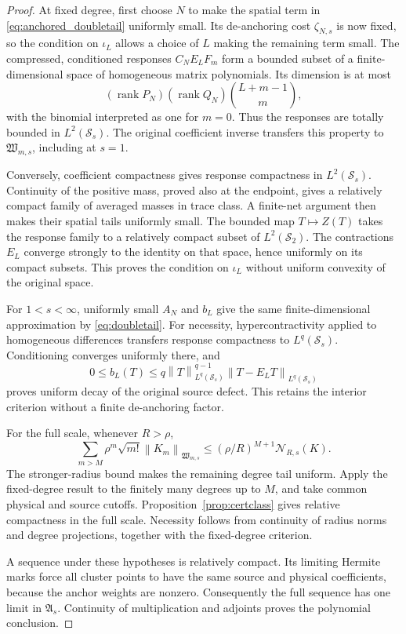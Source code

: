 \documentclass[11pt,a4paper]{amsart}
\numberwithin{equation}{section}
\theoremstyle{definition}
\theoremstyle{remark}
\newcommand{\Sch}{\mathcal S}
\newcommand{\Wc}{\mathfrak W}
\newcommand{\Alg}{\mathfrak A}
\DeclareMathOperator{\rank}{rank}
\newcommand{\norm}[1]{\left\lVert#1\right\rVert}
\newcommand{\Nn}[2]{\mathcal N_{#1,s}(#2)}
\begin{document}
\begin{proof}
At fixed degree, first choose $N$ to make the spatial term in \eqref{eq:anchored_doubletail} uniformly small. Its de-anchoring cost $\zeta_{N,s}$ is now fixed, so the condition on $\iota_L$ allows a choice of $L$ making the remaining term small. The compressed, conditioned responses $C_NE_LF_m$ form a bounded subset of a finite-dimensional space of homogeneous matrix polynomials. Its dimension is at most
\[
 (\rank P_N)(\rank Q_N)\binom{L+m-1}{m},
\]
with the binomial interpreted as one for $m=0$. Thus the responses are totally bounded in $L^2(\Sch_s)$. The original coefficient inverse transfers this property to $\Wc_{m,s}$, including at $s=1$.

Conversely, coefficient compactness gives response compactness in $L^2(\Sch_s)$. Continuity of the positive mass, proved also at the endpoint, gives a relatively compact family of averaged masses in trace class. A finite-net argument then makes their spatial tails uniformly small. The bounded map $T\mapsto Z(T)$ takes the response family to a relatively compact subset of $L^2(\Sch_2)$. The contractions $E_L$ converge strongly to the identity on that space, hence uniformly on its compact subsets. This proves the condition on $\iota_L$ without uniform convexity of the original space.

For $1<s<\infty$, uniformly small $A_N$ and $b_L$ give the same finite-dimensional approximation by \eqref{eq:doubletail}. For necessity, hypercontractivity applied to homogeneous differences transfers response compactness to $L^q(\Sch_s)$. Conditioning converges uniformly there, and
\[
 0\le b_L(T)\le q\norm T_{L^q(\Sch_s)}^{q-1}
                         \norm{T-E_LT}_{L^q(\Sch_s)}
\]
proves uniform decay of the original source defect. This retains the interior criterion without a finite de-anchoring factor.

For the full scale, whenever $R>\rho$,
\begin{equation}\label{eq:strongradiustail}
 \sum_{m>M}\rho^m\sqrt{m!}\norm{K_m}_{\Wc_{m,s}}
 \le(\rho/R)^{M+1}\Nn R K.
\end{equation}
The stronger-radius bound makes the remaining degree tail uniform. Apply the fixed-degree result to the finitely many degrees up to $M$, and take common physical and source cutoffs. Proposition~\ref{prop:certclass} gives relative compactness in the full scale. Necessity follows from continuity of radius norms and degree projections, together with the fixed-degree criterion.

A sequence under these hypotheses is relatively compact. Its limiting Hermite marks force all cluster points to have the same source and physical coefficients, because the anchor weights are nonzero. Consequently the full sequence has one limit in $\Alg_s$. Continuity of multiplication and adjoints proves the polynomial conclusion.
\end{proof}
\end{document}
